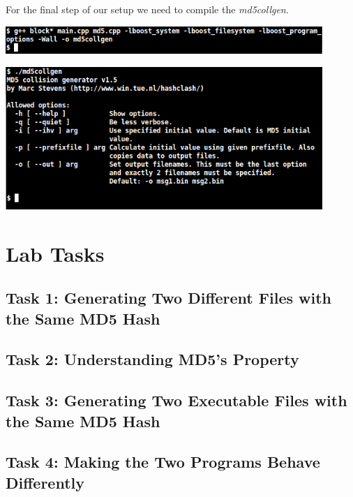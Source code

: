 \documentclass[a4paper]{article}
\begin{document}
\bigskip

For the final step of our setup we need to compile the \textit{md5collgen}.

\bigskip

\includegraphics[width=0.9\textwidth]{bash/g++.png}

\includegraphics[width=0.9\textwidth]{bash/md5collgen.png}

\section{Lab Tasks}

\subsection{Task 1: Generating Two Different Files with the Same MD5 Hash}

\subsection{Task 2: Understanding MD5’s Property}

\subsection{Task 3: Generating Two Executable Files with the Same MD5 Hash}

\subsection{Task 4: Making the Two Programs Behave Differently}

\newpage

\printbibliography
\end{document}
